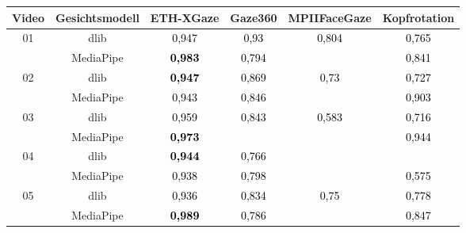 \begin{table}[]
    \centering
    \begin{tabular}{c | c | c c c c}
    \toprule
        \textbf{Video} & \textbf{Gesichtsmodell} & \textbf{ETH-XGaze} & \textbf{Gaze360} & \textbf{MPIIFaceGaze} & \textbf{Kopfrotation} \\
        \hline
\multirow{2}{*}{01} & dlib & \cellcolor[HTML] {0DF200}\textcolor{black}{0,947} & \cellcolor[HTML] {10EE00}\textcolor{black}{0,93} & \cellcolor[HTML] {31CD00}\textcolor{black}{0,804} & \cellcolor[HTML] {3CC300}\textcolor{black}{0,765} \\ & MediaPipe & \cellcolor[HTML] {04FB00}\textcolor{black}{\textbf{0,983}} & \cellcolor[HTML] {34CB00}\textcolor{black}{0,794} & \cellcolor[HTML] {877800}\textcolor{white}{0,469} & \cellcolor[HTML] {28D700}\textcolor{black}{0,841} \\ \hline
\multirow{2}{*}{02} & dlib & \cellcolor[HTML] {0DF200}\textcolor{black}{\textbf{0,947}} & \cellcolor[HTML] {20DE00}\textcolor{black}{0,869} & \cellcolor[HTML] {45BA00}\textcolor{black}{0,73} & \cellcolor[HTML] {45BA00}\textcolor{black}{0,727} \\ & MediaPipe & \cellcolor[HTML] {0EF100}\textcolor{black}{0,943} & \cellcolor[HTML] {27D800}\textcolor{black}{0,846} & \cellcolor[HTML] {926D00}\textcolor{white}{0,429} & \cellcolor[HTML] {18E700}\textcolor{black}{0,903} \\ \hline
\multirow{2}{*}{03} & dlib & \cellcolor[HTML] {09F500}\textcolor{black}{0,959} & \cellcolor[HTML] {28D700}\textcolor{black}{0,843} & \cellcolor[HTML] {699500}\textcolor{black}{0,583} & \cellcolor[HTML] {48B700}\textcolor{black}{0,716} \\ & MediaPipe & \cellcolor[HTML] {06F900}\textcolor{black}{\textbf{0,973}} & \cellcolor[HTML] {718D00}\textcolor{white}{0,554} & \cellcolor[HTML] {C53A00}\textcolor{white}{0,227} & \cellcolor[HTML] {0EF100}\textcolor{black}{0,944} \\ \hline
\multirow{2}{*}{04} & dlib & \cellcolor[HTML] {0EF100}\textcolor{black}{\textbf{0,944}} & \cellcolor[HTML] {3BC300}\textcolor{black}{0,766} & \cellcolor[HTML] {7B8300}\textcolor{white}{0,518} & \cellcolor[HTML] {8F7000}\textcolor{white}{0,441} \\ & MediaPipe & \cellcolor[HTML] {0FF000}\textcolor{black}{0,938} & \cellcolor[HTML] {32CC00}\textcolor{black}{0,798} & \cellcolor[HTML] {986700}\textcolor{white}{0,405} & \cellcolor[HTML] {6C9300}\textcolor{black}{0,575} \\ \hline
\multirow{2}{*}{05} & dlib & \cellcolor[HTML] {10EF00}\textcolor{black}{0,936} & \cellcolor[HTML] {29D500}\textcolor{black}{0,834} & \cellcolor[HTML] {3FC000}\textcolor{black}{0,75} & \cellcolor[HTML] {38C700}\textcolor{black}{0,778} \\ & MediaPipe & \cellcolor[HTML] {01FD00}\textcolor{black}{\textbf{0,989}} & \cellcolor[HTML] {36C900}\textcolor{black}{0,786} & \cellcolor[HTML] {8D7100}\textcolor{white}{0,448} & \cellcolor[HTML] {27D800}\textcolor{black}{0,847} \\ \hline

\end{tabular}
\end{table}
